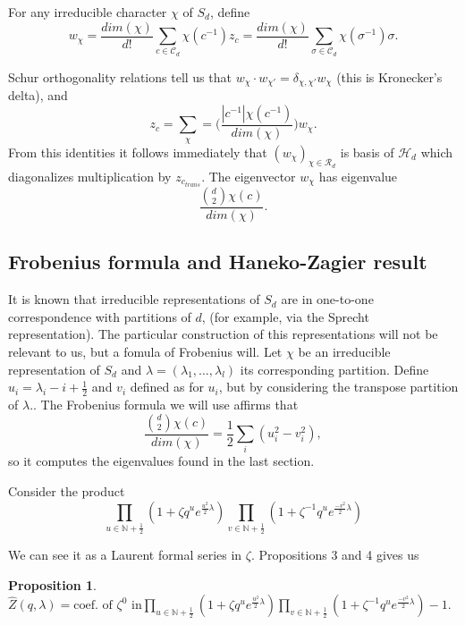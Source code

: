 \documentclass{article}
\numberwithin{equation}{section}
\numberwithin{figure}{section}
\theoremstyle{plain}
\newtheorem{proposition}[theorem]{Proposition}
\theoremstyle{definition}
\numberwithin{equation}{section}
\newtheorem[S, bodystyle=\normalfont\noindent]{defiS}{Definition}[section]
\begin{document}
For any irreducible character $\chi$ of $S_d$, define $$w_{\chi}=\frac{dim(\chi)}{d!}\sum_{c\in{\mathcal{C}_d}}\chi(c^{-1})z_c=\frac{dim(\chi)}{d!}\sum_{\sigma\in{\mathcal{C}_d}}\chi(\sigma^{-1})\sigma.$$

Schur orthogonality relations tell us that $w_{\chi}\cdot w_{\chi'}=\delta_{\chi,\chi'}w_{\chi}$ (this is Kronecker's delta), and $$z_c=\sum_{\chi}=\big(\frac{|c^{-1}|\chi(c^{-1})}{dim(\chi)}\big)w_\chi.$$ From this identities it follows immediately that $(w_\chi)_{\chi\in \mathcal{R}_d}$ is basis of $\mathcal{H}_d$ which diagonalizes multiplication by $z_{c_{trans}}$. The eigenvector $w_{\chi}$ has eigenvalue $$\frac{{d\choose 2} \chi(c)}{dim(\chi)}.$$

\subsection{Frobenius formula and Haneko-Zagier result}

It is known that irreducible representations of $S_d$ are in one-to-one correspondence with partitions of $d$, (for example, via the Sprecht representation). The particular construction of this representations will not be relevant to us, but a fomula of Frobenius will. Let $\chi$ be an irreducible representation of $S_d$ and $\lambda=(\lambda_1,\ldots, \lambda_l)$ its corresponding partition. Define $u_i=\lambda_i-i+\frac{1}{2}$ and $v_i$ defined as for $u_i$, but by considering the transpose partition of $\lambda$.. The Frobenius formula we will use affirms that $$\frac{{d\choose 2} \chi(c)}{dim(\chi)}=\frac{1}{2}\sum_i (u_i^2-v_i^2),$$ so it computes the eigenvalues found in the last section.

Consider the product $$\prod_{u\in \mathbb{N}+\frac{1}{2}}(1+\zeta q^u e^{\frac{u^2}{2}\lambda})\prod_{v\in \mathbb{N}+\frac{1}{2}}(1+\zeta^{-1} q^u e^{\frac{-v^2}{2}\lambda})$$

We can see it as a Laurent formal series in $\zeta$. Propositions 3 and 4 gives us 

\begin{proposition} $\hat{Z}(q,\lambda)=\text{coef. of $\zeta^0$ in} \prod_{u\in \mathbb{N}+\frac{1}{2}}(1+\zeta q^u e^{\frac{u^2}{2}\lambda})\prod_{v\in \mathbb{N}+\frac{1}{2}}(1+\zeta^{-1} q^u e^{\frac{-v^2}{2}\lambda})-1.$ \end{proposition}
\end{document}
